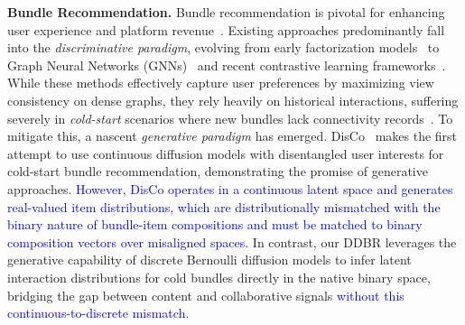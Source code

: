 \documentclass[lettersize,journal]{IEEEtran}
\newcommand{\revise}[1]{\textcolor{blue}{#1}}
\begin{document}
\noindent\textbf{Bundle Recommendation.}
Bundle recommendation is pivotal for enhancing user experience and platform revenue~\cite{sun2024survey}. Existing approaches predominantly fall into the \textit{discriminative paradigm}, evolving from early factorization models~\cite{cao2017embedding, pathak2017generating} to Graph Neural Networks (GNNs)~\cite{chang2020bundle, wei2023strategy,lei2025feature,kim2024content} and recent contrastive learning frameworks~\cite{ma2022crosscbr, ma2024multicbr}. While these methods effectively capture user preferences by maximizing view consistency on dense graphs, they rely heavily on historical interactions, suffering severely in \textit{cold-start} scenarios where new bundles lack connectivity records~\cite{jeon2024cold}. To mitigate this, a nascent \textit{generative paradigm} has emerged. DisCo~\cite{bui2025personalized} makes the first attempt to use continuous diffusion models with disentangled user interests for cold-start bundle recommendation, demonstrating the promise of generative approaches. \revise{However, DisCo operates in a continuous latent space and generates real-valued item distributions, which are distributionally mismatched with the binary nature of bundle-item compositions and must be matched to binary composition vectors over misaligned spaces.} In contrast, our DDBR leverages the generative capability of discrete Bernoulli diffusion models to infer latent interaction distributions for cold bundles directly in the native binary space, bridging the gap between content and collaborative signals \revise{without this continuous-to-discrete mismatch}.
\end{document}

